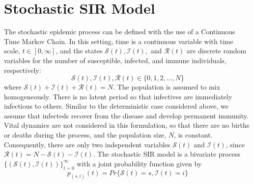 \documentclass[reqno,11pt]{amsart}
\begin{document}
\section{Stochastic SIR Model}
The stochastic epidemic process can be defined with the use of a Continuous Time Markov Chain. In this setting, time is a continuous variable with time scale, $t \in [0, \infty]$, and the states $\mathcal S(t), \mathcal I(t),$ and $\mathcal R(t)$ are discrete random variables for the number of susceptible, infected, and immune individuals, respectively:
\begin{equation*}
\mathcal S(t), \mathcal I(t), \mathcal R(t) \in \lbrace 0, 1, 2, ...,N \rbrace
\end{equation*}
where $\mathcal S(t) + \mathcal I(t) + \mathcal R(t) = N$. The population is assumed to mix homogeneously. There is no latent period so that infectives are immediately infectious to others. Similar to the deterministic case considered above, we assume that infecteds recover from the disease and develop permanent immunity. Vital dynamics are not considered in this formulation, so that there are no births or deaths during the process, and the population size, $N$, is constant. Consequently, there are only two independent variables $\mathcal S(t)$ and $\mathcal I(t)$, since $\mathcal R(t) = N - \mathcal S(t) - \mathcal I(t)$. The stochastic SIR model is a bivariate process $\lbrace (\mathcal S(t), \mathcal I(t)) \rbrace _{t=0}^\infty$ with a joint probability function given by
\begin {equation}\label{SIR_JointPDF}
p_{(s,i)}(t) = Pr \lbrace \mathcal S(t) = s, \mathcal I(t) = i \rbrace
\end {equation}


\end{document}
